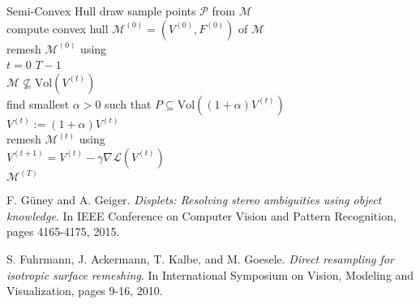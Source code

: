 \documentclass[12pt,a4paper]{article}
\newcommand{\Vol}{\ensuremath{\mathrm{Vol}}}
\begin{document}
\begin{algorithm}[t]
  \small
	\begin{algo}{Semi-Convex Hull}{
	\label{alg:data-hull}
	}
	  draw sample points $\mathcal{P}$ from $\mathcal{M}$\\
	  compute convex hull $\mathcal{M}^{(0)} = (V^{(0)}, F^{(0)})$ of $\mathcal{M}$\\
	  remesh $\mathcal{M}^{(0)}$ using \cite{FuhrmannAckermannGoesele:2010}\\
		\qfor $t = 0$ \qto $T - 1$\\
		  \qif $\mathcal{M} \not\subseteq \Vol(V^{(t)})$\\
		    \qthen find smallest $\alpha > 0$ such that $P \subseteq \Vol((1 + \alpha)V^{(t)})$\\
		    $V^{(t)} := (1 + \alpha) V^{(t)}$\\
		    remesh $\mathcal{M}^{(t)}$ using \cite{FuhrmannAckermannGoesele:2010}\qfi\\
		  $V^{(t + 1)} = V^{(t)} - \gamma \nabla \mathcal{L}(V^{(t)})$\qrof\\
		\qreturn $\mathcal{M}^{(T)}$
	\end{algo}
	\caption{The semi-convex hull algorithm used in \cite{GueneyGeiger:2015}
	to obtain watertight, simplified meshes.}
\end{algorithm}

\begin{thebibliography}{1}
	 F. G\"{u}ney and A. Geiger.
	\emph{Displets: Resolving stereo ambiguities using object knowledge}.
	In IEEE Conference on Computer Vision and Pattern Recognition, pages 4165-4175, 2015.
	
	 S. Fuhrmann, J. Ackermann, T. Kalbe, and M. Goesele.
	\emph{Direct resampling for isotropic surface remeshing}.
	In International Symposium on Vision, Modeling and Visualization, pages 9-16, 2010.
\end{thebibliography}
\end{document}
